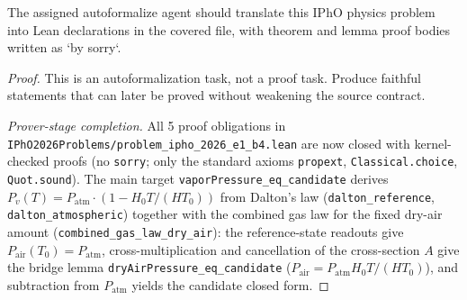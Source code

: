 \begin{theorem}
\label{thm:physics:ipho_2026_e1_b4:target}
\leanok
The assigned autoformalize agent should translate this IPhO physics problem into Lean declarations in the covered file, with theorem and lemma proof bodies written as `by sorry`.
\end{theorem}
\begin{proof}
\leanok
This is an autoformalization task, not a proof task. Produce faithful statements that can later be proved without weakening the source contract.

\emph{Prover-stage completion.} All 5 proof obligations in
\texttt{IPhO2026Problems/problem\_ipho\_2026\_e1\_b4.lean} are now closed with
kernel-checked proofs (no \texttt{sorry}; only the standard axioms
\texttt{propext}, \texttt{Classical.choice}, \texttt{Quot.sound}).  The main
target \texttt{vaporPressure\_eq\_candidate} derives
$P_v(T) = P_{\mathrm{atm}}\cdot(1 - H_0 T/(H T_0))$ from Dalton's law
(\texttt{dalton\_reference}, \texttt{dalton\_atmospheric}) together with the
combined gas law for the fixed dry-air amount
(\texttt{combined\_gas\_law\_dry\_air}): the reference-state readouts give
$P_{\mathrm{air}}(T_0) = P_{\mathrm{atm}}$, cross-multiplication and
cancellation of the cross-section $A$ give the bridge lemma
\texttt{dryAirPressure\_eq\_candidate}
($P_{\mathrm{air}} = P_{\mathrm{atm}} H_0 T / (H T_0)$), and subtraction from
$P_{\mathrm{atm}}$ yields the candidate closed form.
\end{proof}
